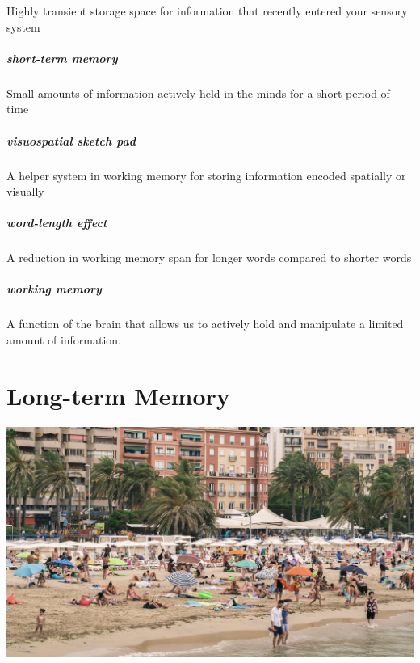 \documentclass[
]{krantz}
\begin{document}
Highly transient storage space for information that recently entered your sensory system

\hypertarget{short-term-memory-1}{%
\paragraph*{short-term memory}\label{short-term-memory-1}}

Small amounts of information actively held in the minds for a short period of time

\hypertarget{visuospatial-sketch-pad}{%
\paragraph*{visuospatial sketch pad}\label{visuospatial-sketch-pad}}

A helper system in working memory for storing information encoded spatially or visually

\hypertarget{word-length-effect}{%
\paragraph*{word-length effect}\label{word-length-effect}}

A reduction in working memory span for longer words compared to shorter words

\hypertarget{working-memory-1}{%
\paragraph*{working memory}\label{working-memory-1}}

A function of the brain that allows us to actively hold and manipulate a limited amount of information.

\hypertarget{long-term-memory-chapter}{%
\chapter{Long-term Memory}\label{long-term-memory-chapter}}

\begin{center}\includegraphics[width=1\linewidth]{images/ch5/fig0} \end{center}
\end{document}
